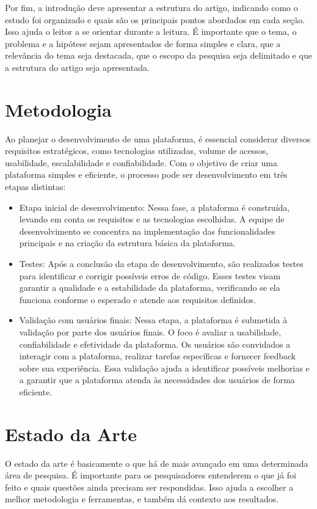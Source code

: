 \documentclass[12pt]{article}
\begin{document}
Por fim, a introdução deve apresentar a estrutura do artigo, indicando como o estudo foi organizado e quais são os principais pontos abordados em cada seção. Isso ajuda o leitor a se orientar durante a leitura. É importante que o tema, o problema e a hipótese sejam apresentados de forma simples e clara, que a relevância do tema seja destacada, que o escopo da pesquisa seja delimitado e que a estrutura do artigo seja apresentada.

\section{Metodologia} \label{sec:firstpage}
Ao planejar o desenvolvimento de uma plataforma, é essencial considerar diversos requisitos estratégicos, como tecnologias utilizadas, volume de acessos, usabilidade, escalabilidade e confiabilidade. Com o objetivo de criar uma plataforma simples e eficiente, o processo pode ser desenvolvimento em três etapas distintas:
   \begin{itemize}
       \item Etapa inicial de desenvolvimento: Nessa fase, a plataforma é construída, levando em conta os requisitos e as tecnologias escolhidas. A equipe de desenvolvimento se concentra na implementação das funcionalidades principais e na criação da estrutura básica da plataforma.
       \item Testes: Após a conclusão da etapa de desenvolvimento, são realizados testes para identificar e corrigir possíveis erros de código. Esses testes visam garantir a qualidade e a estabilidade da plataforma, verificando se ela funciona conforme o esperado e atende aos requisitos definidos.
       \item Validação com usuários finais: Nessa etapa, a plataforma é submetida à validação por parte dos usuários finais. O foco é avaliar a usabilidade, confiabilidade e efetividade da plataforma. Os usuários são convidados a interagir com a plataforma, realizar tarefas específicas e fornecer feedback sobre sua experiência. Essa validação ajuda a identificar possíveis melhorias e a garantir que a plataforma atenda às necessidades dos usuários de forma eficiente.
   \end{itemize}

\section{Estado da Arte}
O estado da arte é basicamente o que há de mais avançado em uma determinada área de pesquisa. É importante para os pesquisadores entenderem o que já foi feito e quais questões ainda precisam ser respondidas. Isso ajuda a escolher a melhor metodologia e ferramentas, e também dá contexto aos resultados.
\end{document}
